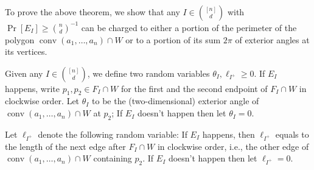 \documentclass{theoretics}
\newcommand{\conv}{\operatorname{conv}}
\begin{document}
To prove the above theorem, we show that any $I \in \binom{[n]}{d}$
with $\Pr[E_I] \geq \binom{n}{d}^{-1}$ can be charged to either
a portion of the perimeter of the polygon $\conv(a_1,\dots,a_n)\cap W$
or to a portion of its sum $2\pi$ of exterior angles at its vertices.
\begin{definition}
    Given any $I \in \binom{[n]}{d}$, we define two random variables $\theta_I, \ell_{I^+} \geq 0$.
    If $E_I$ happens, write $p_1, p_2 \in F_I \cap W$ for the first and the second endpoint of $F_I \cap W$ in clockwise order.
    Let $\theta_I$ to be the (two-dimensional) exterior angle of $\conv(a_1, \ldots, a_n) \cap W$ at $p_2$; 
    If $E_I$ doesn't happen then let $\theta_I = 0$.
    
    Let $\ell_{I^+}$ denote the following random variable: 
    If $E_I$ happens, then $\ell_{I^+}$ equals to the length of the next edge
    after $F_I \cap W$ in clockwise order, i.e., the other edge
    of $\conv(a_1, \ldots, a_n) \cap W$ containing $p_2$.
    If $E_I$ doesn't happen then let $\ell_{I^+} = 0$.
\end{definition}
    
    

    
\end{document}
